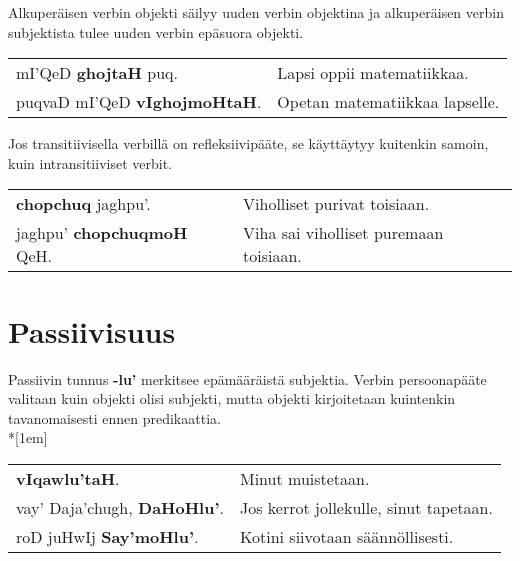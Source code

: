 \documentclass{book}
\begin{document}
Alkuperäisen verbin objekti säilyy uuden verbin objektina ja alkuperäisen verbin subjektista tulee uuden verbin epäsuora objekti.

\ifxetex
\else
    \begin{tabular}{l l}
        mI'QeD \textbf{ghojtaH} puq. & Lapsi oppii matematiikkaa. \\
        puqvaD mI'QeD \textbf{vIghojmoHtaH}. & Opetan matematiikkaa lapselle. \\
    \end{tabular}
\fi

Jos transitiivisella verbillä on refleksiivipääte, se käyttäytyy kuitenkin samoin, kuin intransitiiviset verbit.

\ifxetex
\else
    \begin{tabular}{l l}
        \textbf{chopchuq} jaghpu'. & Viholliset purivat toisiaan. \\
        jaghpu' \textbf{chopchuqmoH} QeH. & Viha sai viholliset puremaan toisiaan. \\
    \end{tabular}
\fi

\section{Passiivisuus}\label{sec:passiivi}

Passiivin tunnus \textbf{-lu'} merkitsee epämääräistä subjektia.
Verbin persoonapääte valitaan kuin objekti olisi subjekti, mutta objekti kirjoitetaan kuintenkin tavanomaisesti ennen predikaattia.
\\*[1em]
\begin{tabular}{l l}
    \textbf{vIqawlu'taH}. & Minut muistetaan. \\
    vay' Daja'chugh, \textbf{DaHoHlu'}. & Jos kerrot jollekulle, sinut tapetaan. \\
    roD juHwIj \textbf{Say'moHlu'}. & Kotini siivotaan säännöllisesti. \\
\end{tabular}
\end{document}
